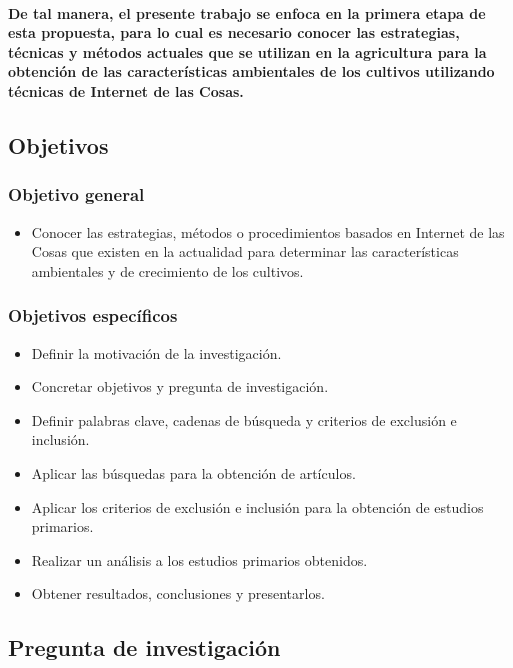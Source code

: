 \documentclass[10pt, twocolumn]{article}
\begin{document}
\paragraph{De tal manera, el presente trabajo se enfoca en la primera etapa de esta propuesta, para lo cual es necesario conocer las estrategias, técnicas y métodos actuales que se utilizan en la agricultura para la obtención de las características ambientales de los cultivos utilizando técnicas de Internet de las Cosas.}

\subsection{Objetivos}
\subsubsection{Objetivo general}
\begin{itemize}
	\item{Conocer las estrategias, métodos o procedimientos basados en Internet de las Cosas que existen en la actualidad para determinar las características ambientales y de crecimiento de los cultivos.}
\end{itemize}
\subsubsection{Objetivos específicos}
\begin{itemize}
	\item{Definir la motivación de la investigación.}
	\item{Concretar objetivos y pregunta de investigación.}
	\item{Definir palabras clave, cadenas de búsqueda y criterios de exclusión e inclusión.}
	\item{Aplicar las búsquedas para la obtención de artículos.}
	\item{Aplicar los criterios de exclusión e inclusión para la obtención de estudios primarios.}
	\item{Realizar un análisis a los estudios primarios obtenidos.}
	\item{Obtener resultados, conclusiones y presentarlos.}
\end{itemize}

\subsection{Pregunta de investigación}
\end{document}
